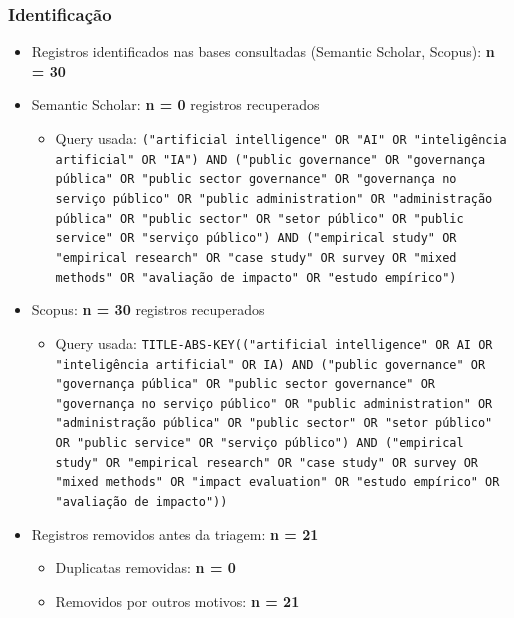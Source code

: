 \documentclass[12pt,a4paper]{article}
\begin{document}
\subsubsection{Identificação}
\label{sec:org044be45}
\begin{itemize}
\item Registros identificados nas bases consultadas (Semantic Scholar, Scopus): \textbf{n = 30}
\item Semantic Scholar: \textbf{n = 0} registros recuperados
\begin{itemize}
\item Query usada: \texttt{("artificial intelligence" OR "AI" OR "inteligência artificial" OR "IA") AND ("public governance" OR "governança pública" OR "public sector governance" OR "governança no serviço público" OR "public administration" OR "administração pública" OR "public sector" OR "setor público" OR "public service" OR "serviço público") AND ("empirical study" OR "empirical research" OR "case study" OR survey OR "mixed methods" OR "avaliação de impacto" OR "estudo empírico")}
\end{itemize}
\item Scopus: \textbf{n = 30} registros recuperados
\begin{itemize}
\item Query usada: \texttt{TITLE-ABS-KEY(("artificial intelligence" OR AI OR "inteligência artificial" OR IA) AND ("public governance" OR "governança pública" OR "public sector governance" OR "governança no serviço público" OR "public administration" OR "administração pública" OR "public sector" OR "setor público" OR "public service" OR "serviço público") AND ("empirical study" OR "empirical research" OR "case study" OR survey OR "mixed methods" OR "impact evaluation" OR "estudo empírico" OR "avaliação de impacto"))}
\end{itemize}
\item Registros removidos antes da triagem: \textbf{n = 21}
\begin{itemize}
\item Duplicatas removidas: \textbf{n = 0}
\item Removidos por outros motivos: \textbf{n = 21}
\end{itemize}
\end{itemize}
\end{document}
